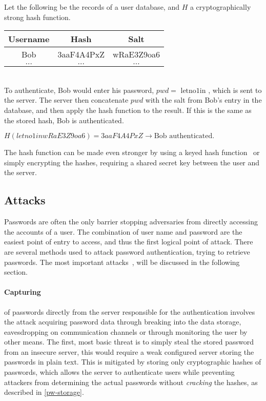 \begin{example}
    Let the following be the records of a user database, and $H$ a cryptographically strong hash function. \\
    \begin{tabular}{|c|c|c|}
        \hline
        Username & Hash & Salt \\
        \hline
        Bob & 3aaF4A4PxZ & wRaE3Z9oa6 \\
        \hline
        $\dots$ & $\dots$ & $\dots$ \\
        \hline
    \end{tabular}
    \\
  To authenticate, Bob would enter his password, $pwd=\text{ letno1in }$, which is sent to the server. The server then concatenate $pwd$ with the salt from Bob's entry in the database, and then apply the hash function to the result. If this is the same as the stored hash, Bob is authenticated.\\
 \centerline{   $H(letno1inwRaE3Z9oa6) = 3aaF4A4PxZ \rightarrow \text{Bob authenticated}.$  }

\end{example}



The hash function can be made even stronger by using a keyed hash function~\cite{keyedhash} or simply encrypting the hashes, requiring a shared secret key between the user and the server. 



\subsection{Attacks}\label{atck}
Passwords are often the only barrier stopping adversaries from directly accessing the accounts of a user. The combination of user name and password are the easiest point of entry to access, and thus the first logical point of attack. There are several methods used to attack password authentication, trying to retrieve passwords. The most important attacks~\cite{nist-guide, strong-pws_florencio}, will be discussed in the following section. 
\paragraph{Capturing} of passwords directly from the server responsible for the authentication involves the attack acquiring password data through breaking into the data storage, eavesdropping on communication channels or through monitoring the user by other means. The first, most basic threat is to simply steal the stored password from an insecure server, this would require a weak configured server storing the passwords in plain text. This is mitigated by storing only cryptographic hashes of passwords, which allows the server to authenticate users while preventing attackers from determining the actual passwords without \emph{cracking} the hashes, as described in \autoref{pw-storage}.

